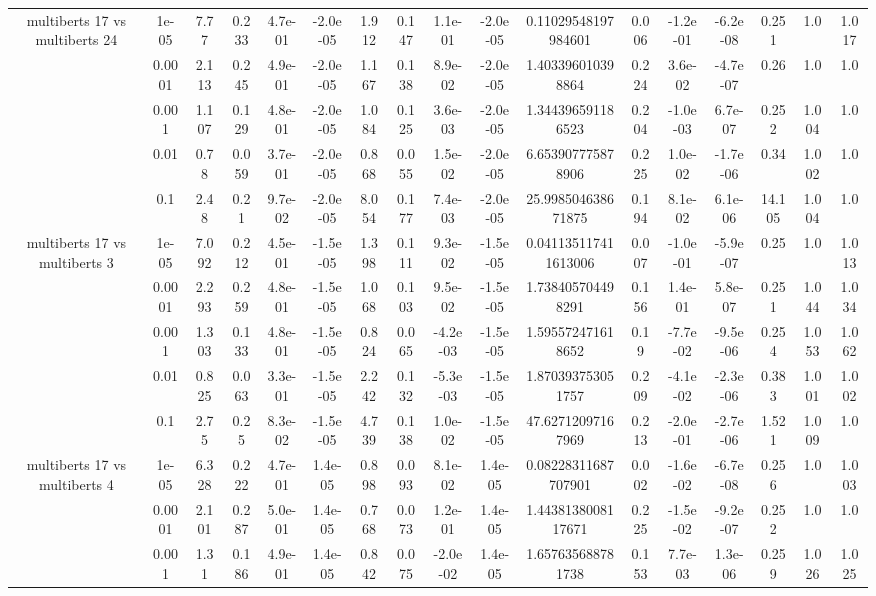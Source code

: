\begin{tabular}{|c|c|c|c|c|c|c|c|c|c|c|c|c|c|c|c|c|}
\hline
\multirow{5}{*}{multiberts 17 vs multiberts 24} & 1e-05 & 7.77 & 0.233 & 4.7e-01 & -2.0e-05 & 1.912 & 0.147 & 1.1e-01 & -2.0e-05 & 0.11029548197984601 & 0.006 & -1.2e-01 & -6.2e-08 & 0.251 & 1.0 & 1.017 \\
 & 0.0001 & 2.113 & 0.245 & 4.9e-01 & -2.0e-05 & 1.167 & 0.138 & 8.9e-02 & -2.0e-05 & 1.403396010398864 & 0.224 & 3.6e-02 & -4.7e-07 & 0.26 & 1.0 & 1.0 \\
 & 0.001 & 1.107 & 0.129 & 4.8e-01 & -2.0e-05 & 1.084 & 0.125 & 3.6e-03 & -2.0e-05 & 1.344396591186523 & 0.204 & -1.0e-03 & 6.7e-07 & 0.252 & 1.004 & 1.0 \\
 & 0.01 & 0.78 & 0.059 & 3.7e-01 & -2.0e-05 & 0.868 & 0.055 & 1.5e-02 & -2.0e-05 & 6.653907775878906 & 0.225 & 1.0e-02 & -1.7e-06 & 0.34 & 1.002 & 1.0 \\
 & 0.1 & 2.48 & 0.21 & 9.7e-02 & -2.0e-05 & 8.054 & 0.177 & 7.4e-03 & -2.0e-05 & 25.998504638671875 & 0.194 & 8.1e-02 & 6.1e-06 & 14.105 & 1.004 & 1.0 \\
\hline
\multirow{5}{*}{multiberts 17 vs multiberts 3} & 1e-05 & 7.092 & 0.212 & 4.5e-01 & -1.5e-05 & 1.398 & 0.111 & 9.3e-02 & -1.5e-05 & 0.041135117411613006 & 0.007 & -1.0e-01 & -5.9e-07 & 0.25 & 1.0 & 1.013 \\
 & 0.0001 & 2.293 & 0.259 & 4.8e-01 & -1.5e-05 & 1.068 & 0.103 & 9.5e-02 & -1.5e-05 & 1.738405704498291 & 0.156 & 1.4e-01 & 5.8e-07 & 0.251 & 1.044 & 1.034 \\
 & 0.001 & 1.303 & 0.133 & 4.8e-01 & -1.5e-05 & 0.824 & 0.065 & -4.2e-03 & -1.5e-05 & 1.595572471618652 & 0.19 & -7.7e-02 & -9.5e-06 & 0.254 & 1.053 & 1.062 \\
 & 0.01 & 0.825 & 0.063 & 3.3e-01 & -1.5e-05 & 2.242 & 0.132 & -5.3e-03 & -1.5e-05 & 1.870393753051757 & 0.209 & -4.1e-02 & -2.3e-06 & 0.383 & 1.001 & 1.002 \\
 & 0.1 & 2.75 & 0.25 & 8.3e-02 & -1.5e-05 & 4.739 & 0.138 & 1.0e-02 & -1.5e-05 & 47.62712097167969 & 0.213 & -2.0e-01 & -2.7e-06 & 1.521 & 1.009 & 1.0 \\
\hline
\multirow{5}{*}{multiberts 17 vs multiberts 4} & 1e-05 & 6.328 & 0.222 & 4.7e-01 & 1.4e-05 & 0.898 & 0.093 & 8.1e-02 & 1.4e-05 & 0.08228311687707901 & 0.002 & -1.6e-02 & -6.7e-08 & 0.256 & 1.0 & 1.003 \\
 & 0.0001 & 2.101 & 0.287 & 5.0e-01 & 1.4e-05 & 0.768 & 0.073 & 1.2e-01 & 1.4e-05 & 1.4438138008117671 & 0.225 & -1.5e-02 & -9.2e-07 & 0.252 & 1.0 & 1.0 \\
 & 0.001 & 1.31 & 0.186 & 4.9e-01 & 1.4e-05 & 0.842 & 0.075 & -2.0e-02 & 1.4e-05 & 1.657635688781738 & 0.153 & 7.7e-03 & 1.3e-06 & 0.259 & 1.026 & 1.025 \\

\end{tabular}
